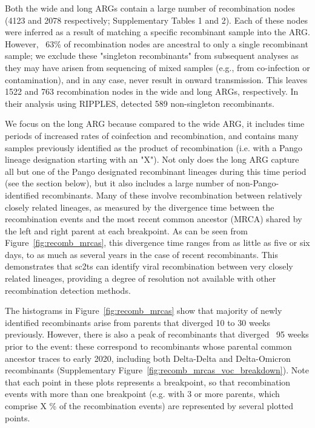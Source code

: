 \documentclass{article}
\begin{document}
Both the wide and long ARGs contain a large number of recombination nodes (4123
and 2078 respectively; Supplementary Tables 1 and 2). Each of these nodes were
inferred as a result of matching a specific recombinant sample into the ARG.
However, ~63\% of recombination nodes are ancestral to only a single
recombinant sample; we exclude these "singleton recombinants" from subsequent
analyses as they may have arisen from sequencing of mixed samples (e.g., from
co-infection or contamination), and in any case, never result in onward
transmission.  This leaves 1522 and 763 recombination nodes in the wide and
long ARGs, respectively. In their analysis using RIPPLES,
\cite{Turakhia2022-it} detected 589 non-singleton recombinants.

We focus on the long ARG because compared to the wide ARG, it includes time
periods of increased rates of coinfection and recombination, and contains many
samples previously identified as the product of recombination (i.e. with a
Pango lineage designation starting with an "X"). Not only does the long ARG
capture all but one of the Pango designated recombinant lineages during this
time period (see the section below), but it also includes a large number of
non-Pango-identified recombinants. Many of these involve recombination between
relatively closely related lineages, as measured by the divergence time between
the recombination events and the most recent common ancestor (MRCA) shared by
the left and right parent at each breakpoint. As can be seen from
Figure~\ref{fig:recomb_mrcas}, this divergence time ranges from as little as
five or six days, to as much as several years in the case of recent
recombinants. This demonstrates that sc2ts can identify viral recombination
between very closely related lineages, providing a degree of resolution not
available with other recombination detection methods.

The histograms in Figure~\ref{fig:recomb_mrcas} show that
majority of newly identified recombinants arise from parents that diverged 10 to 30 weeks previously. However, there is also a peak of recombinants that diverged ~95 weeks prior to the event: these correspond to recombinants whose parental common ancestor traces to early 2020, including both Delta-Delta and Delta-Omicron recombinants (Supplementary Figure~\ref{fig:recomb_mrcas_voc_breakdown}). Note that each point in these plots represents a breakpoint, so that recombination events with more than one breakpoint (e.g. with 3 or more parents, which comprise X \% of the recombination events) are represented by several plotted points.
\end{document}
